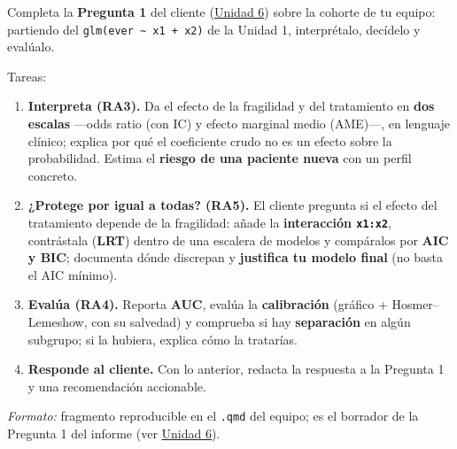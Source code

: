 \documentclass[
  letterpaper,
  DIV=11,
  numbers=noendperiod]{scrartcl}
\providecommand{\tightlist}{%
  \setlength{\itemsep}{0pt}\setlength{\parskip}{0pt}}\usepackage{longtable,booktabs,array}
\begin{document}
\begin{tcolorbox}[enhanced jigsaw, breakable, colframe=quarto-callout-important-color-frame, left=2mm, arc=.35mm, colbacktitle=quarto-callout-important-color!10!white, toprule=.15mm, colback=white, coltitle=black, rightrule=.15mm, opacitybacktitle=0.6, title=\textcolor{quarto-callout-important-color}{\faExclamation}\hspace{0.5em}{Tarea del estudiante (1.2) --- resuelve la Pregunta 1 del caso}, titlerule=0mm, toptitle=1mm, bottomtitle=1mm, leftrule=.75mm, bottomrule=.15mm, opacityback=0]

Completa la \textbf{Pregunta 1} del cliente
(\protect\hyperlink{sec-u16}{Unidad 6}) sobre la cohorte de tu equipo:
partiendo del \texttt{glm(ever\ \textasciitilde{}\ x1\ +\ x2)} de la
Unidad 1, interprétalo, decídelo y evalúalo.

Tareas:

\begin{enumerate}
\def\labelenumi{\arabic{enumi}.}
\tightlist
\item
  \textbf{Interpreta (RA3).} Da el efecto de la fragilidad y del
  tratamiento en \textbf{dos escalas} ---odds ratio (con IC) y efecto
  marginal medio (AME)---, en lenguaje clínico; explica por qué el
  coeficiente crudo no es un efecto sobre la probabilidad. Estima el
  \textbf{riesgo de una paciente nueva} con un perfil concreto.
\item
  \textbf{¿Protege por igual a todas? (RA5).} El cliente pregunta si el
  efecto del tratamiento depende de la fragilidad: añade la
  \textbf{interacción \texttt{x1:x2}}, contrástala (\textbf{LRT}) dentro
  de una escalera de modelos y compáralos por \textbf{AIC y BIC};
  documenta dónde discrepan y \textbf{justifica tu modelo final} (no
  basta el AIC mínimo).
\item
  \textbf{Evalúa (RA4).} Reporta \textbf{AUC}, evalúa la
  \textbf{calibración} (gráfico + Hosmer--Lemeshow, con su salvedad) y
  comprueba si hay \textbf{separación} en algún subgrupo; si la hubiera,
  explica cómo la tratarías.
\item
  \textbf{Responde al cliente.} Con lo anterior, redacta la respuesta a
  la Pregunta 1 y una recomendación accionable.
\end{enumerate}

\emph{Formato:} fragmento reproducible en el \texttt{.qmd} del equipo;
es el borrador de la Pregunta 1 del informe (ver
\protect\hyperlink{sec-u16}{Unidad 6}).

\end{tcolorbox}
\end{document}

